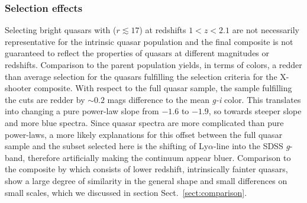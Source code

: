 \documentclass{aa}    %
\newcommand{\sectionname}{Sect.}
\newcommand{\Sect}[1]{\sectionname~\ref{sect:#1}}
\newcommand{\sect}[1]{\Sect{#1}}
\newcommand{\sectlabel}[1]{\label{sect:#1}}
\newcommand{\lya}{Ly$\alpha$}
\begin{document}
{\subsubsection{Selection effects}  \sectlabel{Selection effects}
Selecting bright quasars with ($r \lesssim 17$) at redshifts $1 < z < 2.1$ are not necessarily representative for the intrinsic quasar population \citep{Paris2014} and the final composite is not guaranteed to reflect the properties of quasars at different magnitudes or redshifts. Comparison to the parent population yields, in terms of colors, a redder than average selection for the quasars fulfilling the selection criteria for the X-shooter composite. With respect to the full quasar sample, the sample fulfilling the cuts are redder by $\sim 0.2$ mags difference to the mean \textit{g-i} color. This translates into changing a pure power-law slope from $-1.6$ to $-1.9$, so towards steeper slope and more blue spectra. Since quasar spectra are more complicated than pure power-laws, a more likely explanations for this offset between the full quasar sample and the subset selected here is the shifting of \lya-line into the SDSS \textit{g}-band, therefore artificially making the continuum appear bluer.
Comparison to the composite by \citet{VandenBerk2001} which consists of lower redshift, intrinsically fainter quasars, show a large degree of similarity in the general shape and small differences on small scales, which we discussed in section \sect{comparison}. 


}
\end{document}

